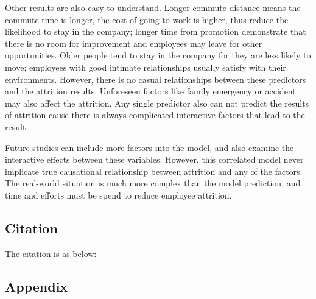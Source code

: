 \documentclass[
]{article}
\begin{document}
Other results are also easy to understand. Longer commute distance means
the commute time is longer, the cost of going to work is higher, thus
reduce the likelihood to stay in the company; longer time from promotion
demonstrate that there is no room for improvement and employees may
leave for other opportunities. Older people tend to stay in the company
for they are less likely to move; employees with good intimate
relationships usually satisfy with their environments. However, there is
no casual relationships between these predictors and the attrition
results. Unforeseen factors like family emergency or accident may also
affect the attrition. Any single predictor also can not predict the
results of attrition cause there is always complicated interactive
factors that lead to the result.

Future studies can include more factors into the model, and also examine
the interactive effects between these variables. However, this
correlated model never implicate true causational relationship between
attrition and any of the factors. The real-world situation is much more
complex than the model prediction, and time and efforts must be spend to
reduce employee attrition.

\hypertarget{citation}{%
\subsection{Citation}\label{citation}}

The citation is as below:

\hypertarget{appendix}{%
\subsection{Appendix}\label{appendix}}
\end{document}
